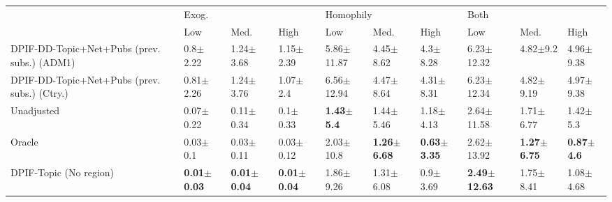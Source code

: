 \begin{tabular}{llllllllll}
\toprule
{} & \multicolumn{3}{l}{Exog.} & \multicolumn{3}{l}{Homophily} & \multicolumn{3}{l}{Both} \\
{} &                     Low &                    Med. &                    High &                    Low &                    Med. &                    High &                      Low &                    Med. &                   High \\
\midrule
DPIF-DD-Topic+Net+Pubs (prev. subs.) (ADM1)  &            0.8$\pm$2.22 &           1.24$\pm$3.68 &           1.15$\pm$2.39 &         5.86$\pm$11.87 &           4.45$\pm$8.62 &            4.3$\pm$8.28 &           6.23$\pm$12.32 &            4.82$\pm$9.2 &          4.96$\pm$9.38 \\
DPIF-DD-Topic+Net+Pubs (prev. subs.) (Ctry.) &           0.81$\pm$2.26 &           1.24$\pm$3.76 &            1.07$\pm$2.4 &         6.56$\pm$12.94 &           4.47$\pm$8.64 &           4.31$\pm$8.31 &           6.23$\pm$12.34 &           4.82$\pm$9.19 &          4.97$\pm$9.38 \\
Unadjusted                                   &           0.07$\pm$0.22 &           0.11$\pm$0.34 &            0.1$\pm$0.33 &  \textbf{1.43$\pm$5.4} &           1.44$\pm$5.46 &           1.18$\pm$4.13 &           2.64$\pm$11.58 &           1.71$\pm$6.77 &           1.42$\pm$5.3 \\
Oracle                                       &            0.03$\pm$0.1 &           0.03$\pm$0.11 &           0.03$\pm$0.12 &          2.03$\pm$10.8 &  \textbf{1.26$\pm$6.68} &  \textbf{0.63$\pm$3.35} &           2.62$\pm$13.92 &  \textbf{1.27$\pm$6.75} &  \textbf{0.87$\pm$4.6} \\
DPIF-Topic (No region)                       &  \textbf{0.01$\pm$0.03} &  \textbf{0.01$\pm$0.04} &  \textbf{0.01$\pm$0.04} &          1.86$\pm$9.26 &           1.31$\pm$6.08 &            0.9$\pm$3.69 &  \textbf{2.49$\pm$12.63} &           1.75$\pm$8.41 &          1.08$\pm$4.68 \\
\bottomrule
\end{tabular}
